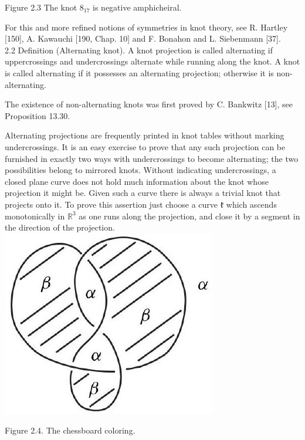 \documentclass[10pt, letterpaper]{article}
\begin{document}
Figure 2.3 The knot $8_{17}$ is negative amphicheiral.

For this and more refined notions of symmetries in knot theory, see R. Hartley [150], A. Kawauchi [190, Chap. 10] and F. Bonahon and L. Siebenmann [37].\\
2.2 Definition (Alternating knot). A knot projection is called alternating if uppercrossings and undercrossings alternate while running along the knot. A knot is called alternating if it possesses an alternating projection; otherwise it is non-alternating.

The existence of non-alternating knots was first proved by C. Bankwitz [13], see Proposition 13.30.

Alternating projections are frequently printed in knot tables without marking undercrossings. It is an easy exercise to prove that any such projection can be furnished in exactly two ways with undercrossings to become alternating; the two possibilities belong to mirrored knots. Without indicating undercrossings, a closed plane curve does not hold much information about the knot whose projection it might be. Given such a curve there is always a trivial knot that projects onto it. To prove this assertion just choose a curve $\mathfrak{k}$ which ascends monotonically in $\mathbb{R}^{3}$ as one runs along the projection, and close it by a segment in the direction of the projection.\\
\includegraphics[scale=0.2, center]{2025_05_21_9c06be8de7a55410f8c1g-032(1)}

Figure 2.4. The chessboard coloring.
\end{document}
